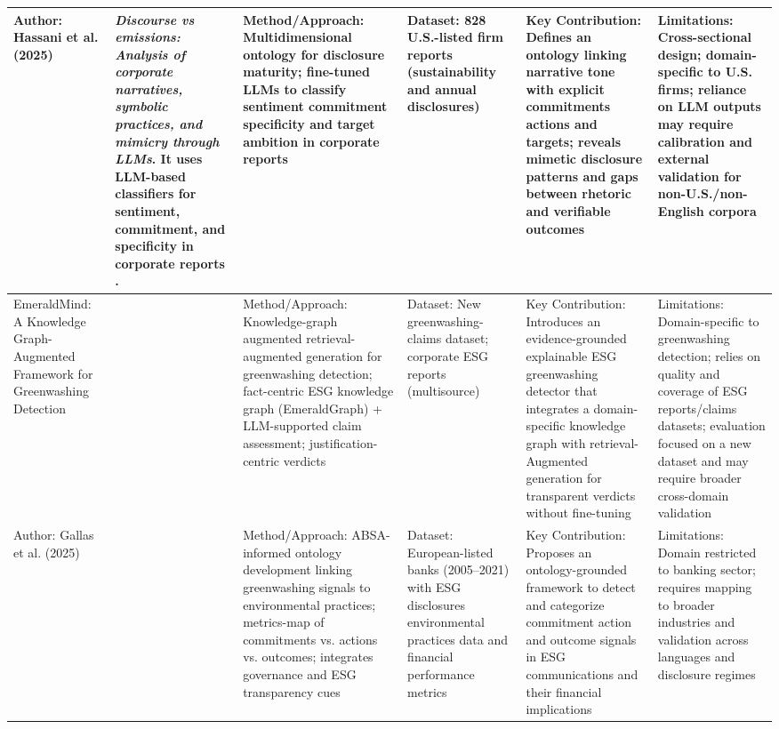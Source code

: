 \documentclass{article}
\begin{document}
\begin{landscape}
\begin{longtable}{p{1.8cm}
p{2.6cm}
p{3.4cm}
p{2.6cm}
p{3.5cm}
p{3.5cm}}
Author: Hassani et al. (2025) & \textit{Discourse vs emissions: Analysis of corporate narratives, symbolic practices, and mimicry through LLMs}. It uses LLM-based classifiers for sentiment, commitment, and specificity in corporate reports  \parencite{bertrand_k__hassani_0085231f}. & Method/Approach: Multidimensional ontology for disclosure maturity; fine-tuned LLMs to classify sentiment commitment specificity and target ambition in corporate reports & Dataset: 828 U.S.-listed firm reports (sustainability and annual disclosures) & Key Contribution: Defines an ontology linking narrative tone with explicit commitments actions and targets; reveals mimetic disclosure patterns and gaps between rhetoric and verifiable outcomes & Limitations: Cross-sectional design; domain-specific to U.S. firms; reliance on LLM outputs may require calibration and external validation for non-U.S./non-English corpora \\ \hline
EmeraldMind: A Knowledge Graph-Augmented Framework for Greenwashing Detection & ~ & Method/Approach: Knowledge-graph augmented retrieval-augmented generation for greenwashing detection; fact-centric ESG knowledge graph (EmeraldGraph) + LLM-supported claim assessment; justification-centric verdicts & Dataset: New greenwashing-claims dataset; corporate ESG reports (multisource) & Key Contribution: Introduces an evidence-grounded explainable ESG greenwashing detector that integrates a domain-specific knowledge graph with retrieval-Augmented generation for transparent verdicts without fine-tuning & Limitations: Domain-specific to greenwashing detection; relies on quality and coverage of ESG reports/claims datasets; evaluation focused on a new dataset and may require broader cross-domain validation \\ \hline
Author: Gallas et al. (2025) & ~ & Method/Approach: ABSA-informed ontology development linking greenwashing signals to environmental practices; metrics-map of commitments vs. actions vs. outcomes; integrates governance and ESG transparency cues & Dataset: European-listed banks (2005–2021) with ESG disclosures environmental practices data and financial performance metrics & Key Contribution: Proposes an ontology-grounded framework to detect and categorize commitment action and outcome signals in ESG communications and their financial implications & Limitations: Domain restricted to banking sector; requires mapping to broader industries and validation across languages and disclosure regimes \\ \hline

\end{longtable}
\end{landscape}
\end{document}
